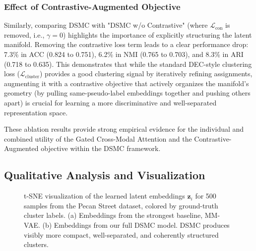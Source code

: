 \documentclass[journal]{IEEEtran}
\begin{document}
\subsubsection{Effect of Contrastive-Augmented Objective}
Similarly, comparing DSMC with "DSMC w/o Contrastive" (where $\mathcal{L}_{\text{con}}$ is removed, i.e., $\gamma=0$) highlights the importance of explicitly structuring the latent manifold. Removing the contrastive loss term leads to a clear performance drop: 7.3\% in ACC (0.824 to 0.751), 6.2\% in NMI (0.765 to 0.703), and 8.3\% in ARI (0.718 to 0.635). This demonstrates that while the standard DEC-style clustering loss ($\mathcal{L}_{\text{cluster}}$) provides a good clustering signal by iteratively refining assignments, augmenting it with a contrastive objective that actively organizes the manifold's geometry (by pulling same-pseudo-label embeddings together and pushing others apart) is crucial for learning a more discriminative and well-separated representation space.

These ablation results provide strong empirical evidence for the individual and combined utility of the Gated Cross-Modal Attention and the Contrastive-Augmented objective within the DSMC framework.

\subsection{Qualitative Analysis and Visualization}

\begin{figure}[h!]
\centering
{}
\hfill %
\caption{t-SNE visualization of the learned latent embeddings $\mathbf{z}_i$ for 500 samples from the Pecan Street dataset, colored by ground-truth cluster labels. (a) Embeddings from the strongest baseline, MM-VAE. (b) Embeddings from our full DSMC model. DSMC produces visibly more compact, well-separated, and coherently structured clusters.}
\label{fig:tsne}
\end{figure}
\end{document}

